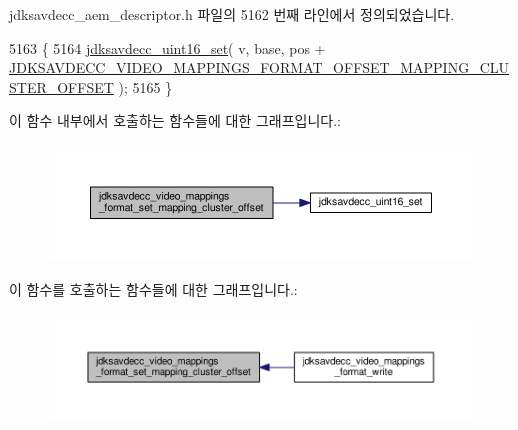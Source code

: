 jdksavdecc\+\_\+aem\+\_\+descriptor.\+h 파일의 5162 번째 라인에서 정의되었습니다.


\begin{DoxyCode}
5163 \{
5164     \hyperlink{group__endian_ga14b9eeadc05f94334096c127c955a60b}{jdksavdecc\_uint16\_set}( v, base, pos + 
      \hyperlink{group__video__mappings__format_ga82875713f9269add7ed6c5b2b920805a}{JDKSAVDECC\_VIDEO\_MAPPINGS\_FORMAT\_OFFSET\_MAPPING\_CLUSTER\_OFFSET}
       );
5165 \}
\end{DoxyCode}


이 함수 내부에서 호출하는 함수들에 대한 그래프입니다.\+:
\nopagebreak
\begin{figure}[H]
\begin{center}
\leavevmode
\includegraphics[width=350pt]{group__video__mappings__format_gabc742cbe6f3c03eca073a8e47b0aabab_cgraph}
\end{center}
\end{figure}




이 함수를 호출하는 함수들에 대한 그래프입니다.\+:
\nopagebreak
\begin{figure}[H]
\begin{center}
\leavevmode
\includegraphics[width=350pt]{group__video__mappings__format_gabc742cbe6f3c03eca073a8e47b0aabab_icgraph}
\end{center}
\end{figure}


